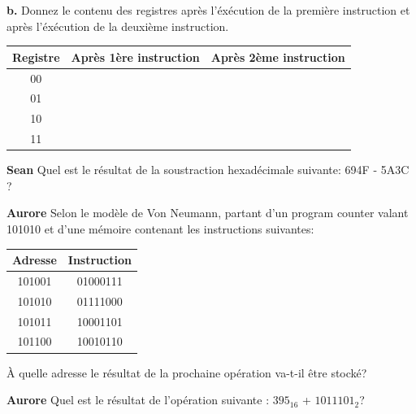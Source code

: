 \begin{Exercice}[10 minutes]
\bigskip

\noindent %
\textbf{b.} Donnez le contenu des registres après l'éxécution de la première instruction et après l'éxécution de la deuxième instruction.

\begin{center}
\begin{tabular}{|c|l|l|}
\hline
\textbf{Registre} & \textbf{Après 1ère instruction} & \textbf{Après 2ème instruction} \\
\hline
00 & & \\
01 & & \\
10 & & \\
11 & & \\
\hline
\end{tabular}
\end{center}
\end{Exercice}

\begin{Exercice}[15 minutes]\textbf{Sean}
Quel est le résultat de la soustraction hexadécimale suivante: 694F - 5A3C ?
\end{Exercice}


\begin{Exercice}[10 minutes]\textbf{Aurore}
Selon le modèle de Von Neumann, partant d'un program counter valant 101010 et d'une mémoire contenant les instructions suivantes:
\begin{table}[h]
\centering
\begin{tabular}{|c|c|}
\hline
\textbf{Adresse} & \textbf{Instruction} \\
\hline
101001 & 01000111 \\
101010 & 01111000 \\
101011 & 10001101 \\
101100 & 10010110 \\
\hline
\end{tabular}
\end{table}

À quelle adresse le résultat de la prochaine opération va-t-il être stocké?


\end{Exercice}

\begin{Exercice}[10 minutes]\textbf{Aurore} Quel est le résultat de l'opération suivante : $395_{16}$ + $1011101_{2}$?

\end{Exercice}

